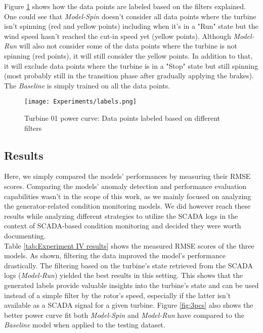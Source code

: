     Figure \ref{fig:labels} shows how the data points are labeled based on the filters explained. One could see that \emph{Model-Spin} 
    doesn't consider all data points where the turbine isn't spinning (red and yellow points) including when it's in a "Run" state
    but the wind speed hasn't reached the cut-in speed yet (yellow points). Although \emph{Model-Run} will also not consider some of the data points
    where the turbine is not spinning (red points), it will still consider the yellow points. In addition to that, it will exclude data points 
    where the turbine is in a "Stop" state but still spinning (most probably still in the transition phase after gradually applying the brakes).
    The \emph{Baseline} is simply trained on all the data points.

    \begin{figure}[H]
        \begin{center}
          \texttt{[image: Experiments/labels.png]}
        \end{center}
        \caption{Turbine 01 power curve: Data points labeled based on different filters}
        \label{fig:labels}
      \end{figure}
    
      \subsection{Results}
      Here, we simply compared the models' performances by measuring their RMSE scores. Comparing the models' anomaly detection 
      and performance evaluation capabilities wasn't in the scope of this work, as we mainly focused on analyzing the generator-related condition 
      monitoring models. We did however reach these results while analyzing different strategies to utilize the SCADA logs in the 
      context of SCADA-based condition monitoring and decided they were worth documenting.\\

      Table \ref{tab:Experiment IV results} shows the measured RMSE scores of the three models. As shown, filtering the data improved
      the model's performance drastically. The filtering based on the turbine's state retrieved from the SCADA logs (\emph{Model-Run}) 
      yielded the best results in this setting. This shows that the generated labels provide valuable insights into the turbine's state 
      and can be used instead of a simple filter by the rotor's speed, especially if the latter isn't available as a SCADA signal for a given turbine.
      Figure \ref{fig:3pcs} also shows the better power curve fit both \emph{Model-Spin} and \emph{Model-Run} have compared to the \emph{Baseline} model 
      when applied to the testing dataset.

